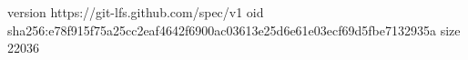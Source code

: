 version https://git-lfs.github.com/spec/v1
oid sha256:e78f915f75a25cc2eaf4642f6900ac03613e25d6e61e03ecf69d5fbe7132935a
size 22036
